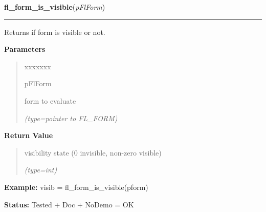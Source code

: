 \hspace{.8\funcindent}\begin{boxedminipage}{\funcwidth}

    \raggedright \textbf{fl\_form\_is\_visible}(\textit{pFlForm})

    \vspace{-1.5ex}

    \rule{\textwidth}{0.5\fboxrule}
\setlength{\parskip}{2ex}
    Returns if form is visible or not.

\setlength{\parskip}{1ex}
      \textbf{Parameters}
      \vspace{-1ex}

      \begin{quote}
        \begin{Ventry}{xxxxxxx}

          \item[pFlForm]

          form to evaluate

            {\it (type=pointer to FL\_FORM)}

        \end{Ventry}

      \end{quote}

      \textbf{Return Value}
    \vspace{-1ex}

      \begin{quote}
      visibility state (0 invisible, non-zero visible)

      {\it (type=int)}

      \end{quote}

\textbf{Example:} visib = fl\_form\_is\_visible(pform)



\textbf{Status:} Tested + Doc + NoDemo = OK



    \end{boxedminipage}

    \label{xformslib:flbasic:fl_form_is_iconified}

    \vspace{0.5ex}

